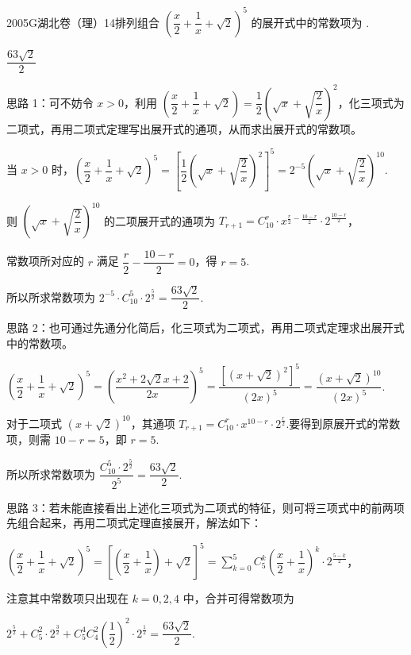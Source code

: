 
\begin{problem}{2005}{G}{湖北卷（理）}{14}{排列组合}
$ \left(\dfrac{x}{2}+\dfrac{1}{x}+\sqrt{2}\right)^5 $ 的展开式中的常数项为 \underline{\hspace{4em}}.
\end{problem}

\begin{answer}
$\dfrac{63\sqrt{2}}{2}$
\end{answer}

\begin{solutions}
思路 1：可不妨令 $x>0$，利用 $\left(\dfrac{x}{2}+\dfrac{1}{x}+\sqrt{2}\right)=\dfrac{1}{2}\left(\sqrt{x}+\sqrt{\dfrac{2}{x}}\right)^2$，化三项式为二项式，再用二项式定理写出展开式的通项，从而求出展开式的常数项。

当 $x>0$ 时，$\left(\dfrac{x}{2}+\dfrac{1}{x}+\sqrt{2}\right)^5=\left[\dfrac{1}{2}\left(\sqrt{x}+\sqrt{\dfrac{2}{x}}\right)^2\right]^5=2^{-5}\left(\sqrt{x}+\sqrt{\dfrac{2}{x}}\right)^{10}$.

则 $\left(\sqrt{x}+\sqrt{\dfrac{2}{x}}\right)^{10}$ 的二项展开式的通项为 $T_{r+1}=C_{10}^r\cdot x^{\frac{r}{2}-\frac{10-r}{2}}\cdot 2^{\frac{10-r}{2}}$，

常数项所对应的 $r$ 满足 $\dfrac{r}{2}-\dfrac{10-r}{2}=0$，得 $r=5$.

所以所求常数项为 $2^{-5}\cdot C_{10}^5\cdot 2^{\frac{5}{2}}=\dfrac{63\sqrt{2}}{2}$.

思路 2：也可通过先通分化简后，化三项式为二项式，再用二项式定理求出展开式中的常数项。

$\left(\dfrac{x}{2}+\dfrac{1}{x}+\sqrt{2}\right)^5=\left(\dfrac{x^2+2\sqrt{2}x+2}{2x}\right)^5=\dfrac{[(x+\sqrt{2})^2]^5}{(2x)^5}=\dfrac{(x+\sqrt{2})^{10}}{(2x)^5}$.

对于二项式 $(x+\sqrt{2})^{10}$，其通项 $T_{r+1}=C_{10}^r\cdot x^{10-r}\cdot 2^{\frac{r}{2}}$.要得到原展开式的常数项，则需 $10-r=5$，即 $r=5$.

所以所求常数项为 $\dfrac{C_{10}^5\cdot 2^{\frac{5}{2}}}{2^5}=\dfrac{63\sqrt{2}}{2}$.

思路 3：若未能直接看出上述化三项式为二项式的特征，则可将三项式中的前两项先组合起来，再用二项式定理直接展开，解法如下：

$\left(\dfrac{x}{2}+\dfrac{1}{x}+\sqrt{2}\right)^5=\left[\left(\dfrac{x}{2}+\dfrac{1}{x}\right)+\sqrt{2}\right]^5=\sum_{k=0}^{5}C_5^k\left(\dfrac{x}{2}+\dfrac{1}{x}\right)^k\cdot 2^{\frac{5-k}{2}}$，

注意其中常数项只出现在 $k=0,2,4$ 中，合并可得常数项为

$2^{\frac{5}{2}}+C_5^2\cdot 2^{\frac{3}{2}}+C_5^4C_4^2\left(\dfrac{1}{2}\right)^2\cdot 2^{\frac{1}{2}}=\dfrac{63\sqrt{2}}{2}$.
\end{solutions}